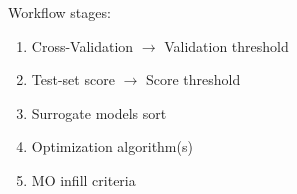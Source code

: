 




Workflow stages:
\begin{enumerate}
    \item Cross-Validation $\rightarrow$ Validation threshold
    \item Test-set score $\rightarrow$ Score threshold
    \item Surrogate models sort
    \item Optimization algorithm(s)
    \item MO infill criteria
\end{enumerate}

